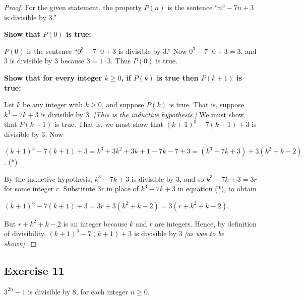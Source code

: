 \documentclass[14pt]{extarticle}
\begin{document}
\begin{proof}
    For the given statement, the property $P(n)$ is the sentence “$n^3 - 7n + 3$ is divisible by 3.”

    {\bf Show that $P(0)$ is true:}

    $P(0)$ is the sentence “$0^3 - 7 \cdot 0 + 3$ is divisible by 3.” Now $0^3 - 7 \cdot 0 + 3 = 3$, and 3 is divisible by 3 because $3 = 1 \cdot 3$. Thus $P(0)$ is true.

        {\bf Show that for every integer $k \geq 0$, if $P(k)$ is true then $P(k + 1)$ is true:}

    Let $k$ be any integer with $k \geq 0$, and suppose $P(k)$ is true. That is, suppose $k^3 - 7k + 3$ is divisible by 3. {\it [This is the inductive hypothesis.]} We must show that $P(k + 1)$ is true. That is, we must show that $(k+1)^3 - 7(k+1) + 3$ is divisible by 3. Now

    $(k+1)^3 - 7(k+1) + 3 = k^3 + 3k^2 + 3k + 1 - 7k - 7 + 3 = (k^3 - 7k + 3) + 3(k^2 + k - 2)$. (*)

    By the inductive hypothesis, $k^3 - 7k + 3$ is divisible by 3, and so $k^3 - 7k + 3 = 3r$ for some integer $r$. Substitute $3r$ in place of $k^3 - 7k + 3$ in equation (*), to obtain

    $(k+1)^3 - 7(k+1) + 3 = 3r + 3(k^2 + k - 2) = 3(r + k^2 + k - 2)$.

    But $r + k^2 + k - 2$ is an integer because $k$ and $r$ are integers. Hence, by definition of divisibility, $(k+1)^3 - 7(k+1) + 3$ is divisible by 3 {\it [as was to be shown]}.
\end{proof}

\subsection{Exercise 11}
$3^{2n} - 1$ is divisible by 8, for each integer $n \geq 0$.
\end{document}
